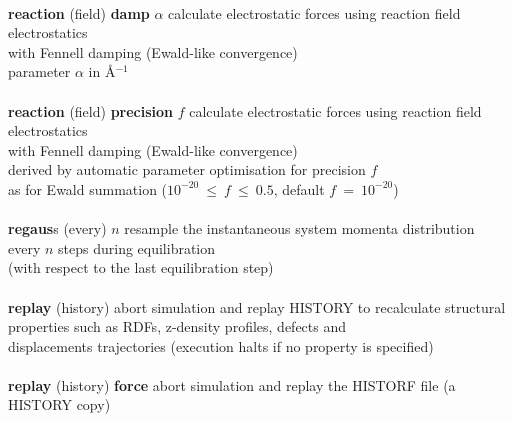 \begin{tabbing}
\>                                              \> \\
\> {\bf reaction} (field) {\bf damp} $\alpha$   \> calculate electrostatic forces using reaction field electrostatics \\
\>                                              \> with Fennell \cite{fennell-06a} damping (Ewald-like convergence) \\
\>                                              \> parameter $\alpha$ in \AA$^{-1}$ \\
\>                                              \> \\
\> {\bf reaction} (field) {\bf precision} $f$   \> calculate electrostatic forces using reaction field electrostatics \\
\>                                              \> with Fennell \cite{fennell-06a} damping (Ewald-like convergence) \\
\>                                              \> derived by automatic parameter optimisation for precision $f$ \\
\>                                              \> as for Ewald summation ($10^{-20}~\le~f~\le~0.5$, default $f~=~10^{-20}$) \\
\>                                              \> \\
\> {\bf regaus}s (every) $n$                    \> resample the instantaneous system momenta distribution \\
\>                                              \> every $n$ steps during equilibration \\
\>                                              \> (with respect to the last equilibration step) \\
\>                                              \> \\
\> {\bf replay} (history)                       \> abort simulation and replay HISTORY to recalculate structural \\
\>                                              \> properties such as RDFs, z-density profiles, defects and \\
\>                                              \> displacements trajectories (execution halts if no property is specified) \\
\>                                              \> \\
\> {\bf replay} (history) {\bf force}           \> abort simulation and replay the HISTORF file (a HISTORY copy) \\

\end{tabbing}
